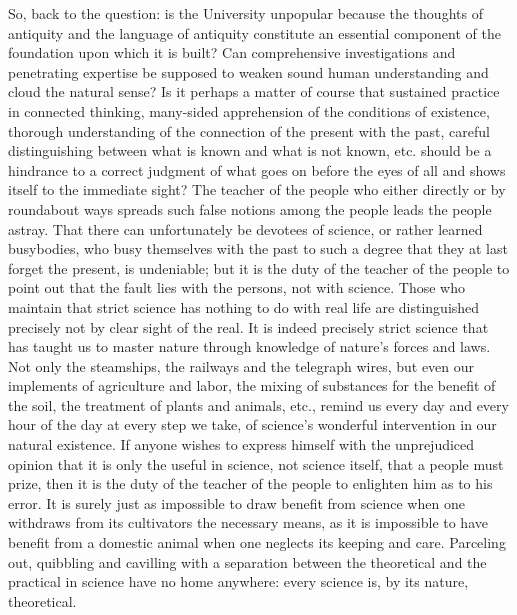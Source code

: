 \documentclass[12pt,a4paper,openany]{book}
\newcommand{\opage}[1]{\marginnote{\footnotesize\textit{[#1]}}}
\newcounter{lect}
\begin{document}
So, back to the question: is the University
unpopular because the thoughts of antiquity and the language of antiquity
constitute an essential component of the foundation upon
\setcounter{footnote}{0}%
\opage{128}which it is built? Can comprehensive investigations
and penetrating expertise be supposed to weaken
sound human understanding and cloud the natural
sense? Is it perhaps a matter of course that sustained
practice in connected thinking, many-sided apprehension
of the conditions of existence, thorough understanding of
the connection of the present with the past, careful distinguishing
between what is known and what is not known, etc.
should be a hindrance to a correct judgment of
what goes on before the eyes of all and shows itself to the
immediate sight? The teacher of the people who either directly
or by roundabout ways spreads such false notions
among the people leads the people astray. That there can unfortunately
be devotees of science, or rather learned busybodies,
who busy themselves with the past to such a degree that they at last
forget the present, is undeniable; but
it is the duty of the teacher of the people to point out
that the fault lies with the persons, not with science.
Those who maintain that strict science has nothing
to do with real life are distinguished
precisely not by clear sight of the real. It is
indeed precisely strict science that has taught us to
master nature through knowledge of nature's forces
and laws. Not only the steamships, the railways and
the telegraph wires, but even our implements of agriculture and
labor, the mixing of substances for the benefit of
the soil, the treatment of plants and animals, etc.,
remind us every day and every hour of the day at
every step we take, of science's wonderful
intervention in our natural existence. If anyone wishes to express
himself with the unprejudiced opinion that it is only the
useful in science, not science itself, that a people
\setcounter{footnote}{0}%
\opage{129}must prize, then it is the duty of the teacher of the people to
enlighten him as to his error. It is surely just
as impossible to draw benefit from science when one
withdraws from its cultivators the necessary means, as it
is impossible to have benefit from a domestic animal when one
neglects its keeping and care. Parceling out, quibbling and
cavilling with a separation between the theoretical and
the practical in science have no home anywhere:
every science is, by its nature, theoretical.
\end{document}
